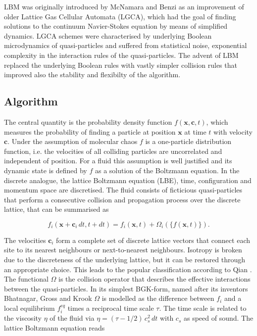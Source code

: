 \documentclass[8.5pt,twoside,twocolumn]{article}
\newcommand{\beq}{\begin{equation}}
\newcommand{\eeq}{\end{equation}}
\begin{document}
LBM was originally introduced by McNamara \cite{McNamara:1988} and 
Benzi \cite{Benzi:1992} as an improvement of older Lattice Gas Cellular Automata (LGCA),
which had the goal of finding solutions to the continuum Navier-Stokes equation by 
means of simplified dynamics. LGCA schemes were characterised by underlying Boolean
microdynamics of quasi-particles and suffered from statistical noise, exponential complexity
in the interaction rules of the quasi-particles. The advent of LBM replaced the underlying 
Boolean rules with vastly simpler collision rules that improved also the stability 
and flexibilty of the algorithm. 
 
\subsection{Algorithm}

The central quantity is the probability density function
$f(\mathbf{x}, \mathbf{c}, t)$, which measures the probability of finding
a particle at position $\mathbf{x}$ at time $t$ with velocity $\mathbf{c}$.
Under the assumption of molecular chaos $f$ is a one-particle distribution function,
i.e. the velocities of all colliding particles are uncorrelated and independent of position. 
For a fluid this assumption is well justified and its dynamic state is defined
by $f$ as a solution of the Boltzmann equation. 
In the discrete analogue, the lattice Boltzmann equation (LBE), time, configuration 
and momentum space are discretised. 
The fluid consists of ficticious quasi-particles that perform a consecutive 
collision and propagation process over the discrete lattice, that can be
summarised as

\beq\label{lbe}
f_i(\mathbf{x}+\mathbf{c}_i\, dt, t+dt)=f_i(\mathbf{x}, t)+\Omega_i(\{f(\mathbf{x},t)\}).
\eeq

The velocities $\mathbf{c}_i$ form a complete set of discrete lattice vectors that
connect each site to its nearest neighbours or next-to-nearest neighbours. 
Isotropy is broken due to the discreteness of the underlying lattice,  but it can be 
restored through an appropriate choice. This leads to the popular classification 
according to Qian \cite{Qian:1992}.
The functional $\Omega$ is the collision operator that describes the effective interactions 
between the quasi-particles. In its simplest BGK-form, named after its inventors
Bhatnagar, Gross and Krook  $\Omega$ is modelled as  
the difference between $f_i$ and a local equilibrium $f_i^{eq}$ times a reciprocal 
time scale $\tau$. The time scale is related to the viscosity $\eta$ of the fluid via 
$\eta =(\tau - 1/2)\,c_s^2\,dt$ with $c_s$ as speed of sound. The lattice Boltzmann
equation reads
\end{document}

